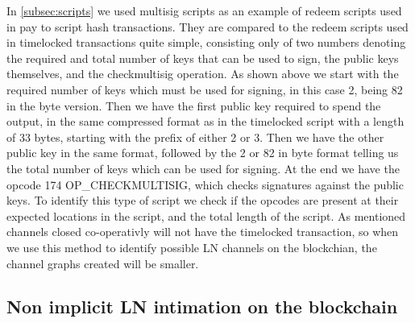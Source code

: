 In \cref{subsec:scripts} we used multisig scripts as an example of redeem scripts used in pay to script hash transactions. They are compared to the redeem scripts used in timelocked transactions quite simple, consisting only of two numbers denoting the required and total number of keys that can be used to sign, the public keys themselves, and the checkmultisig operation. As shown above we start with the required number of keys which must be used for signing, in this case 2, being 82 in the byte version. Then we have the first public key required to spend the output, in the same compressed format as in the timelocked script with a length of 33 bytes, starting with the prefix of either 2 or 3. Then we have the other public key in the same format, followed by the 2 or 82 in byte format telling us the total number of keys which can be used for signing. At the end we have the opcode 174 OP\_CHECKMULTISIG, which checks signatures against the public keys. To identify this type of script we check if the opcodes are present at their expected locations in the script, and the total length of the script. As mentioned channels closed co-operativly will not have the timelocked transaction, so when we use this method to identify possible LN channels on the blockchian, the channel graphs created will be smaller.
\\

\subsection{Non implicit LN intimation on the blockchain}

